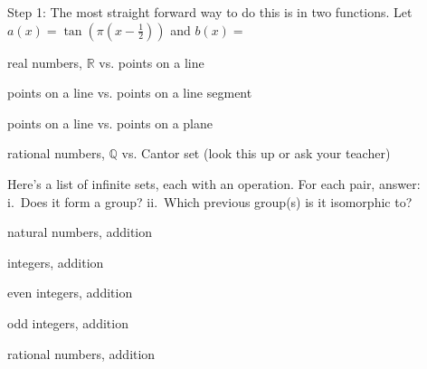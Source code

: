 \documentclass[../gatm_answers.tex]{subfiles}
\begin{document}
Step 1: The most straight forward way to do this is in two functions. Let $a(x)=\tan \left(\pi \left(x-\frac{1}{2}\right)\right)$ and $b(x)=$

\begin{inner_problem}
\item real numbers, $\mathbb{R}$ vs. points on a line
\end{inner_problem}

\begin{inner_problem}
\item points on a line vs. points on a line segment
\end{inner_problem}

\begin{inner_problem}
\item points on a line vs. points on a plane
\end{inner_problem}

\begin{inner_problem}
\item rational numbers, $\mathbb{Q}$ vs. Cantor set (look this up or ask your teacher)
\end{inner_problem}

\begin{outer_problem}
\item Here’s a list of infinite sets, each with an operation. For each pair, answer: i.~Does it form a group? ii.~Which previous group(s) is it isomorphic to?
\end{outer_problem}

\begin{inner_problem}
\item natural numbers, addition
\end{inner_problem}

\begin{inner_problem}
\item integers, addition
\end{inner_problem}

\begin{inner_problem}
\item even integers, addition
\end{inner_problem}

\begin{inner_problem}
\item odd integers, addition
\end{inner_problem}

\begin{inner_problem}
\item rational numbers, addition
\end{inner_problem}
\end{document}
